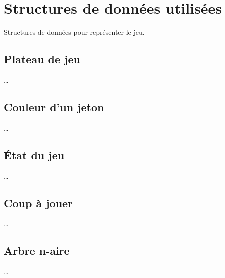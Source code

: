 \chapter{Structures de données utilisées} \label{chapter:structures-donnees}

Structures de données pour représenter le jeu.

\section{Plateau de jeu}

…

\section{Couleur d'un jeton}

…

\section{État du jeu}

…

\section{Coup à jouer}

…

\section{Arbre n-aire}

…

